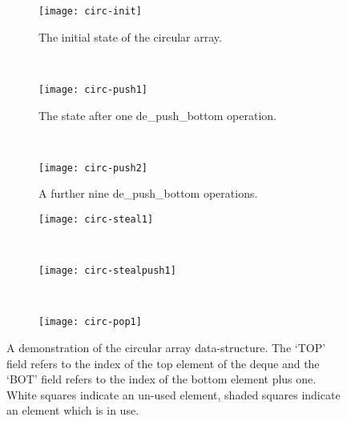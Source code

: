 \vspace{20pt}

\begin{figure}[h]
\centering
\begin{subfigure}[b]{0.31\textwidth}
  \centering    
  \texttt{[image: circ-init]}
  \caption{
     \tiny The initial state of the circular array.
  }
  \label{fig:circ-1}
\end{subfigure}
~ %
\begin{subfigure}[b]{0.31\textwidth}
  \centering
  \texttt{[image: circ-push1]}
  \vspace{1pt}
  \caption{
     \tiny The state after one de\_push\_bottom operation.
  }
  \label{fig:circ-2}
\end{subfigure}
~ %
\begin{subfigure}[b]{0.31\textwidth}
  \centering
  \texttt{[image: circ-push2]}
  \caption{
    \tiny A further nine de\_push\_bottom operations. 
  }
  \label{fig:circ-3}
\end{subfigure}

\vspace{20pt}

\begin{subfigure}[b]{0.31\textwidth}
  \centering
  \texttt{[image: circ-steal1]}
  \caption{
    \tiny 
  }
  \label{fig:circ-4}
\end{subfigure}
~ %
\begin{subfigure}[b]{0.31\textwidth}
  \centering
  \texttt{[image: circ-stealpush1]}
  \caption{
    \tiny 
  }
  \label{fig:circ-4}
\end{subfigure}
~ %
\begin{subfigure}[b]{0.31\textwidth}
  \centering
  \texttt{[image: circ-pop1]}
  \caption{
    \tiny 
  }
  \label{fig:circ-4}
\end{subfigure}

\caption{
    A demonstration of the circular array data-structure. 
    The `TOP' field refers to the index of the top element of the deque and
    the `BOT' field refers to the index of the bottom element plus one.
    White squares indicate an un-used element, shaded squares indicate an
    element which is in use.
}
\label{fig:juliaimgs}
\end{figure}

\vspace{20pt}
